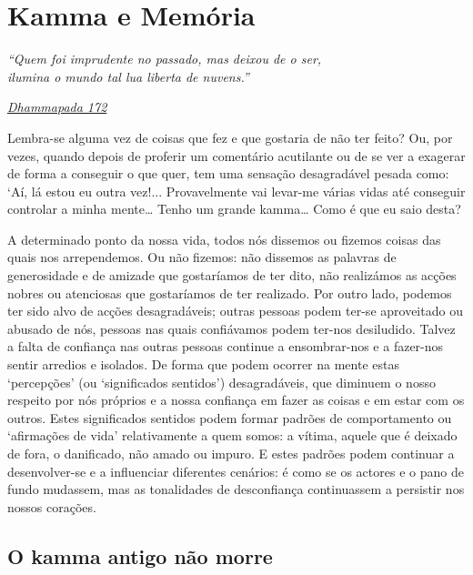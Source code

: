 
\chapter{Kamma e Memória}


\emph{``Quem foi imprudente no passado, mas deixou de o ser,\\
ilumina o mundo tal lua liberta de nuvens.''}

\href{https://suttacentral.net/dhp167-178/en/buddharakkhita}{\emph{Dhammapada 172}}

Lembra-se alguma vez de coisas que fez e que gostaria de não ter feito? Ou, por vezes, quando depois de proferir um comentário acutilante ou de se ver a exagerar de forma a conseguir o que quer, tem uma sensação desagradável pesada como: `Aí, lá estou eu outra vez!... Provavelmente vai levar-me várias vidas até conseguir controlar a minha mente\ldots{} Tenho um grande kamma\ldots{} Como é que eu saio desta?\textquotesingle{}

A determinado ponto da nossa vida, todos nós dissemos ou fizemos coisas das quais nos arrependemos. Ou não fizemos: não dissemos as palavras de generosidade e de amizade que gostaríamos de ter dito, não realizámos as acções nobres ou atenciosas que gostaríamos de ter realizado. Por outro lado, podemos ter sido alvo de acções desagradáveis; outras pessoas podem ter-se aproveitado ou abusado de nós, pessoas nas quais confiávamos podem ter-nos desiludido. Talvez a falta de confiança nas outras pessoas continue a ensombrar-nos e a fazer-nos sentir arredios e isolados. De forma que podem ocorrer na mente estas `percepções' (ou `significados sentidos') desagradáveis, que diminuem o nosso respeito por nós próprios e a nossa confiança em fazer as coisas e em estar com os outros. Estes significados sentidos podem formar padrões de comportamento ou `afirmações de vida' relativamente a quem somos: a vítima, aquele que é deixado de fora, o danificado, não amado ou impuro. E estes padrões podem continuar a desenvolver-se e a influenciar diferentes cenários: é como se os actores e o pano de fundo mudassem, mas as tonalidades de desconfiança continuassem a persistir nos nossos corações.

\section{O kamma antigo não morre}


